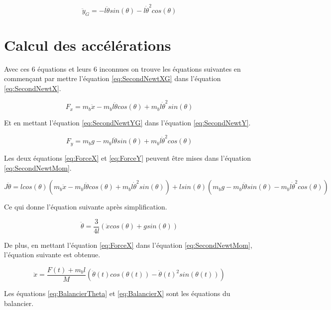 \begin{equation}\label{eq:SecondNewtYG}
  \ddot{y}_G = - l\ddot{\theta}sin(\theta) - l\dot{\theta}^2cos(\theta)
\end{equation}

\section{Calcul des accélérations}\label{sec:CalcAcc}
Avec ces 6 équations et leurs 6 inconnues on trouve les équations suivantes en commençant par mettre l'équation \ref{eq:SecondNewtXG}
dans l'équation \ref{eq:SecondNewtX}.

\begin{equation}\label{eq:ForceX}
  F_x = m_b\ddot{x} - m_bl\ddot{\theta}cos(\theta) + m_bl\dot{\theta}^2sin(\theta)
\end{equation}

Et en mettant l'équation \ref{eq:SecondNewtYG} dans l'équation \ref{eq:SecondNewtY}.

\begin{equation}\label{eq:ForceY}
  F_y = m_bg - m_bl\ddot{\theta}sin(\theta) + m_bl\dot{\theta}^2cos(\theta)
\end{equation}

Les deux équations \ref{eq:ForceX} et \ref{eq:ForceY} peuvent être mises dans l'équation \ref{eq:SecondNewtMom}.

\begin{equation*}
  J\ddot{\theta} = lcos(\theta)(m_b\ddot{x} - m_bl\ddot{\theta}cos(\theta) + m_bl\dot{\theta}^2sin(\theta)) + lsin(\theta)(m_bg - m_bl\ddot{\theta}sin(\theta) - m_bl\dot{\theta}^2cos(\theta))
\end{equation*}

Ce qui donne l'équation suivante après simplification.

\begin{equation}\label{eq:BalancierTheta}
  \ddot{\theta} = \frac{3}{4l}(\ddot{x}cos(\theta) + gsin(\theta))
\end{equation}

De plus, en mettant l'équation \ref{eq:ForceX} dans l'équation \ref{eq:SecondNewtMom}, l'équation suivante est obtenue.

\begin{equation}\label{eq:BalancierX}
  \ddot{x} = \frac{F(t) + m_bl}{M}(\ddot{\theta}(t)cos(\theta(t)) - \dot{\theta}(t)^2sin(\theta(t)))
\end{equation}

Les équations \ref{eq:BalancierTheta} et \ref{eq:BalancierX} sont les équations du balancier.